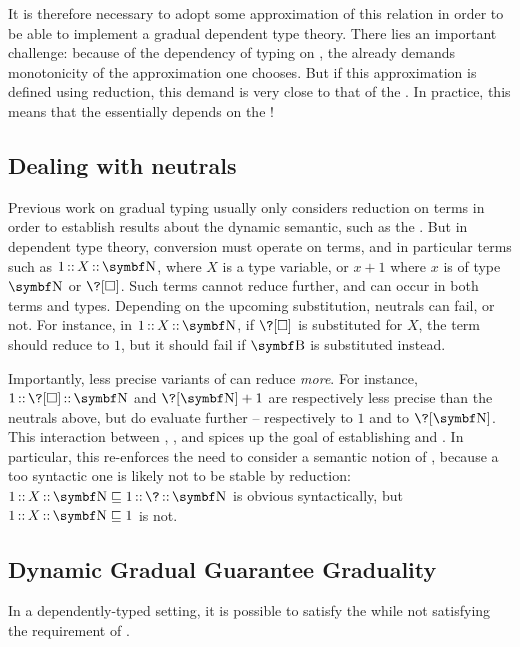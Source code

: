 It is therefore necessary to adopt some approximation of this relation
in order to be able to implement a gradual dependent type theory.
There lies an important challenge: because of the dependency of typing on ,
the  already demands monotonicity of the approximation
one chooses. But if this approximation is defined using reduction, this demand is
very close to that of the .%
In practice, this means that the  essentially depends on the !

\subsection{Dealing with neutrals}
Previous work on gradual typing usually only considers reduction on  terms in order to establish results about the dynamic semantic, such as the .
%
But in dependent type theory, conversion must operate on  terms,
and in particular  terms such as $\asc{\asc{1}{X}}{\Nat}$,
where $X$ is a type variable, or $x + 1$ where $x$ is of type $\Nat$ or $\?[\uni]$.
%
Such  terms cannot reduce further, and can occur in both terms and types.
Depending on the upcoming substitution, neutrals can fail, or not. For instance, in $\asc{\asc{1}{X}}{\Nat}$, if $\?[\uni]$ is substituted for $X$, the term should reduce to $1$,
but it should fail if $\Bool$ is substituted instead.

Importantly, less precise variants of  can reduce \emph{more}.
For instance, $\asc{\asc{1}{\?[\uni]}}{\Nat}$ and $\?[\Nat] + 1$ are respectively
less precise than the neutrals above, but do evaluate further – respectively to $1$
and to $\?[\Nat]$. This interaction between , , and 
spices up the goal of establishing  and .
In particular, this re-enforces the need to consider a semantic notion of ,
because a too syntactic one is likely not to be stable by reduction:
$\asc{\asc{1}{X}}{\Nat} \pre \asc{\asc{1}{\?}}{\Nat}$ is obvious syntactically,
but $\asc{\asc{1}{X}}{\Nat} \pre 1$ is not.

\subsection{Dynamic Gradual Guarantee \vs Graduality}
In a dependently-typed setting, it is possible to satisfy the  while not satisfying the  requirement of .

